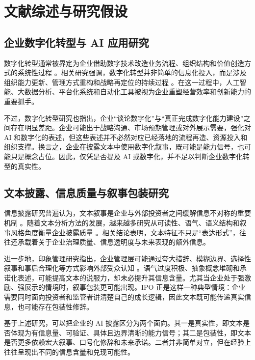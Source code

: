 \section{文献综述与研究假设}

\subsection{企业数字化转型与 AI 应用研究}

数字化转型通常被界定为企业借助数字技术改造业务流程、组织结构和价值创造方式的系统性过程 \citep{Vial_2019,Verhoef_2021}。相关研究强调，数字化转型并非简单的信息化投入，而是涉及组织能力更新、管理方式重构和战略再定位的持续过程 \citep{Warner_2019}。在这一过程中，人工智能、大数据分析、平台化系统和自动化工具被视为企业重塑经营效率和创新能力的重要抓手。

不过，数字化转型研究也指出，企业“谈论数字化”与“真正完成数字化能力建设”之间存在明显差距。企业可能出于战略沟通、市场预期管理或对外展示需要，强化对 AI 和数字化的表述，但这些表述并不必然对应已经落地的流程再造、资源投入和组织支撑。换言之，企业在披露文本中使用数字化叙事，既可能是能力信号，也可能只是概念占位。因此，仅凭是否提及 AI 或数字化，并不足以判断企业数字化转型的真实性。

\subsection{文本披露、信息质量与叙事包装研究}

信息披露研究普遍认为，文本叙事是企业与外部投资者之间缓解信息不对称的重要机制 \citep{Healy_2001,Verrecchia_1990}。随着文本分析方法的发展，越来越多研究从可读性、语气、语义结构和叙事风格角度衡量企业披露质量 \citep{LOUGHRAN_2016,LOUGHRAN_2014,Li_2008}。相关结论表明，文本特征不只是“表达形式”，往往还承载着关于企业治理质量、信息透明度与未来表现的额外信息。

进一步地，印象管理研究指出，企业管理层可能通过夸大措辞、模糊边界、选择性叙事和事后合理化等方式影响外部受众认知 \citep{MerklDaviesConcept2011,MerklDaviesSensemaking2011,Henry_2008}。语气过度积极、抽象概念堆砌和承诺化表述，可能提高文本的说服力，却未必提升其信息含量。尤其当企业处于强激励、强展示的情境时，叙事包装更可能出现。IPO 正是这样一种典型情境：企业需要同时面向投资者和监管者讲清楚自己的成长逻辑，因此文本既可能传递真实信息，也可能存在包装性修辞。

基于上述研究，可以把企业的 AI 披露区分为两个面向。其一是真实性，即文本是否体现为有信息量、可验证、具体且边界清晰的能力信号；其二是包装性，即文本是否更多依赖宏大叙事、口号化修辞和未来承诺。二者并非简单对立，但在经验上往往呈现出不同的信息含量和兑现可能性。

